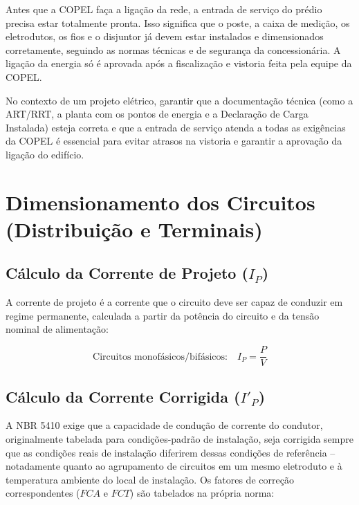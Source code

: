 \documentclass[12pt,openright,oneside,a4paper,brazil]{abntex2}
\begin{document}
Antes que a COPEL faça a ligação da rede, a entrada de serviço do prédio precisa estar totalmente pronta. Isso significa que o poste, a caixa de medição, os eletrodutos, os fios e o disjuntor já devem estar instalados e dimensionados corretamente, seguindo as normas técnicas e de segurança da concessionária. A ligação da energia só é aprovada após a fiscalização e vistoria feita pela equipe da COPEL.

No contexto de um projeto elétrico, garantir que a documentação técnica (como a ART/RRT, a planta com os pontos de energia e a Declaração de Carga Instalada) esteja correta e que a entrada de serviço atenda a todas as exigências da COPEL é essencial para evitar atrasos na vistoria e garantir a aprovação da ligação do edifício.

\section{Dimensionamento dos Circuitos (Distribuição e Terminais)}

\hspace{1.27cm}\subsection{Cálculo da Corrente de Projeto ($I_P$)}

\hspace{1.27cm} A corrente de projeto é a corrente que o circuito deve ser capaz de
conduzir em regime permanente, calculada a partir da potência do circuito e
da tensão nominal de alimentação:

\begin{equation}
    \text{Circuitos monofásicos/bifásicos:} \quad I_P = \dfrac{P}{V}
    \label{eq:corrente_mono}
\end{equation}

\subsection{Cálculo da Corrente Corrigida ($I'_{P}$)}

\hspace{1.27cm} A NBR 5410 exige que a capacidade de condução de corrente do condutor,
originalmente tabelada para condições-padrão de instalação, seja corrigida
sempre que as condições reais de instalação diferirem dessas condições de
referência -- notadamente quanto ao agrupamento de circuitos em um mesmo
eletroduto e à temperatura ambiente do local de instalação.
Os fatores de correção correspondentes ($FCA$ e $FCT$) são tabelados na
própria norma:
\end{document}
